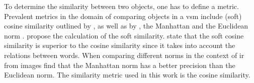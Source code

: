To determine the similarity between two objects, one has to define a metric.
Prevalent metrics in the domain of comparing objects in a \ac{vsm} include (soft) cosine similarity 
outlined by \citeauthor{soft_cosine2014}, as well as by \citeauthor{soft_cosine2017} \cite{soft_cosine2014, soft_cosine2017},
the Manhattan and the Euclidean norm \cite{euclidean_l2_norm2015}.
\citeauthor{soft_cosine2014} propose the calculation of the soft similarity.
\citeauthor{soft_cosine2017} state that the soft cosine similarity is superior to the cosine similarity since it takes into account the relations between words.
When comparing different norms in the context of \ac{ir} from images \citeauthor{euclidean_l2_norm2015} find that the Manhattan norm has a better 
precision than the Euclidean norm.
The similarity metric used in this work is the cosine similarity.